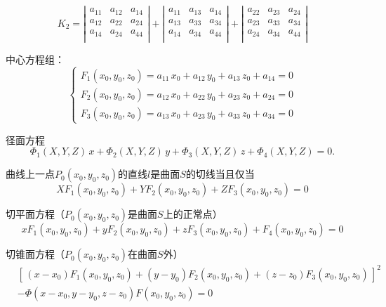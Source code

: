 \begin{equation}
K_2=
\left| 
\begin{array}{ccc}
	a_{11} & a_{12} & a_{14}  \\
	a_{12} & a_{22} & a_{24}  \\
	a_{14} & a_{24} & a_{44}  \\
\end{array}
\right| 
+
\left| 
\begin{array}{ccc}
a_{11} & a_{13} & a_{14}  \\
a_{13} & a_{33} & a_{34}  \\
a_{14} & a_{34} & a_{44}  \\
\end{array}
\right| 
+
\left| 
\begin{array}{ccc}
a_{22} & a_{23} & a_{24}  \\
a_{23} & a_{33} & a_{34}  \\
a_{24} & a_{34} & a_{44}  \\
\end{array}
\right| 
\end{equation}

\par 中心方程组：
\begin{equation}
\begin{cases}
F_1(x_0,y_0,z_0)=a_{11} \, x_0 + a_{12} \, y_0 + a_{13} \, z_0 + a_{14} = 0 \\
F_2(x_0,y_0,z_0)=a_{12} \, x_0 + a_{22} \, y_0 + a_{23} \, z_0 + a_{24} = 0 \\
F_3(x_0,y_0,z_0)=a_{13} \, x_0 + a_{23} \, y_0 + a_{33} \, z_0 + a_{34} = 0
\end{cases}
\end{equation}

\par 径面方程
\begin{equation}
\varPhi_1(X,Y,Z) \, x+\varPhi_2(X,Y,Z) \, y+\varPhi_3(X,Y,Z) \, z +\varPhi_4(X,Y,Z)=0.
\end{equation}

\par 曲线上一点$P_0(x_0,y_0,z_0)$的直线$l$是曲面$S$的切线当且仅当
\begin{equation}
XF_1(x_0,y_0,z_0)  +YF_2(x_0,y_0,z_0)+ZF_3(x_0,y_0,z_0)=0
\end{equation}

\par 切平面方程（$P_0(x_0,y_0,z_0)$是曲面$S$上的正常点）
\begin{equation}
xF_1(x_0,y_0,z_0)  +yF_2(x_0,y_0,z_0)+zF_3(x_0,y_0,z_0)+F_4(x_0,y_0,z_0)=0
\end{equation}

\par 切锥面方程（$P_0(x_0,y_0,z_0)$在曲面$S$外）
\begin{equation}
\begin{split}
&[\, (x-x_0)F_1(x_0,y_0,z_0)+(y-y_0)F_2(x_0,y_0,z_0)+(z-z_0)F_3(x_0,y_0,z_0)\,]^2\\
&-\varPhi(x-x_0,y-y_0,z-z_0)F(x_0,y_0,z_0) = 0
\end{split}
\end{equation}